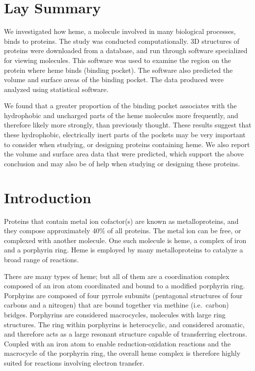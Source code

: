 \documentclass[a4paper, nobind]{templates/ociamthesis}
\begin{document}
\flushbottom

\hypertarget{lay-summary}{%
\chapter*{Lay Summary}\label{lay-summary}}

\adjustmtc
{}

We investigated how heme, a molecule involved in many biological processes, binds to proteins. The study was conducted computationally. 3D structures of proteins were downloaded from a database, and run through software specialized for viewing molecules. This software was used to examine the region on the protein where heme binds (binding pocket). The software also predicted the volume and surface areas of the binding pocket. The data produced were analyzed using statistical software.

We found that a greater proportion of the binding pocket associates with the hydrophobic and uncharged parts of the heme molecules more frequently, and therefore likely more strongly, than previously thought. These results suggest that these hydrophobic, electrically inert parts of the pockets may be very important to consider when studying, or designing proteins containing heme. We also report the volume and surface area data that were predicted, which support the above conclusion and may also be of help when studying or designing these proteins.

\hypertarget{introduction}{%
\chapter*{Introduction}\label{introduction}}

\adjustmtc
{}

Proteins that contain metal ion cofactor(s) are known as metalloproteins, and they compose approximately 40\% of all proteins. The metal ion can be free, or complexed with another molecule. One such molecule is heme, a complex of iron and a porphyrin ring. Heme is employed by many metalloproteins to catalyze a broad range of reactions\autocite{Poulos2014}.

There are many types of heme; but all of them are a coordination complex composed of an iron atom coordinated and bound to a modified porphyrin ring. Porphyins are composed of four pyrrole subunits (pentagonal structures of four carbons and a nitrogen) that are bound together via methine (i.e.~carbon) bridges. Porphyrins are considered macrocycles, molecules with large ring structures. The ring within porphyrins is heterocyclic, and considered aromatic, and therefore acts as a large resonant structure capable of transferring electrons. Coupled with an iron atom to enable reduction-oxidation reactions and the macrocycle of the porphyrin ring, the overall heme complex is therefore highly suited for reactions involving electron transfer\autocite{Kleingardner2015}.
\end{document}
